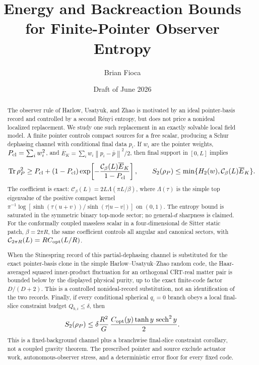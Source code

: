 \documentclass[11pt]{article}
\title{Energy and Backreaction Bounds\\
for Finite-Pointer Observer Entropy}
\author{Brian Fioca}
\date{Draft of June 2026}
\theoremstyle{definition}
\theoremstyle{remark}
\newcommand{\Ebar}{\overline E_{K}}
\newcommand{\Pcl}{P_{\rm cl}}
\newcommand{\Tr}{\operatorname{Tr}}
\newcommand{\sech}{\operatorname{sech}}
\newcommand{\norm}[1]{\left\lVert#1\right\rVert}
\begin{document}
\maketitle

\begin{abstract}
The observer rule of Harlow, Usatyuk, and Zhao is motivated by an ideal
pointer-basis record and controlled by a second R\'enyi entropy, but does not
price a nonideal localized replacement.  We study one such replacement in an
exactly solvable local field model.  A finite pointer controls compact sources
for a free scalar,
producing a Schur dephasing channel with conditional final data $p_i$.  If
$w_i$ are the pointer weights,
$\Pcl=\sum_iw_i^2$, and
$\Ebar=\sum_iw_i\norm{p_i-\bar p}^2/2$, then final support in $[0,L]$ implies
\[
 \Tr\rho_P^2\geq\Pcl+(1-\Pcl)
 \exp\!\left[-\frac{\mathcal C_\beta(L)\Ebar}{1-\Pcl}\right],
 \qquad
 S_2(\rho_P)\leq\min\{H_2(w),\mathcal C_\beta(L)\Ebar\}.
\]
The coefficient is exact:
$\mathcal C_\beta(L)=2L\Lambda(\pi L/\beta)$, where $\Lambda(\tau)$ is the
simple top eigenvalue of the positive compact
kernel
$\pi^{-1}\log[\sinh(\tau(u+v))/\sinh(\tau|u-v|)]$ on $(0,1)$.
The entropy bound is saturated in the symmetric binary top-mode sector; no
general-$d$ sharpness is claimed.  For
the conformally coupled massless scalar in a four-dimensional de Sitter static
patch, $\beta=2\pi R$, the same coefficient controls all angular and canonical
sectors, with $\mathcal C_{2\pi R}(L)=RC_{\rm opt}(L/R)$.

When the Stinespring record of this partial-dephasing channel is substituted
for the exact pointer-basis clone in the simple Harlow--Usatyuk--Zhao random
code, the Haar-averaged squared inner-product fluctuation for an orthogonal
CRT-real matter pair is bounded below by the displayed physical purity, up to
the exact finite-code factor $D/(D+2)$.  This is a controlled nonideal-record
substitution, not an identification of the two records.  Finally, if every
conditional spherical $q_i=0$ branch obeys a
local final-slice constraint budget $Q_{b,i}\leq\delta$, then
\[
 S_2(\rho_P)\leq
 \delta\frac{R^2}{G}\,
 \frac{C_{\rm opt}(y)\tanh y\,\sech^2y}{2}.
\]
This is a fixed-background channel plus a branchwise final-slice constraint
corollary, not a coupled gravity theorem.  The prescribed pointer and source
exclude actuator work, autonomous-observer stress, and a deterministic error
floor for every fixed code.
\end{abstract}








\appendix


\begingroup
\small
\let\originalthebibliography\thebibliography
\renewcommand{\thebibliography}[1]{%
  \originalthebibliography{#1}%
  \setlength{\itemsep}{0pt}%
  \setlength{\parskip}{0pt}%
}


\endgroup
\end{document}
